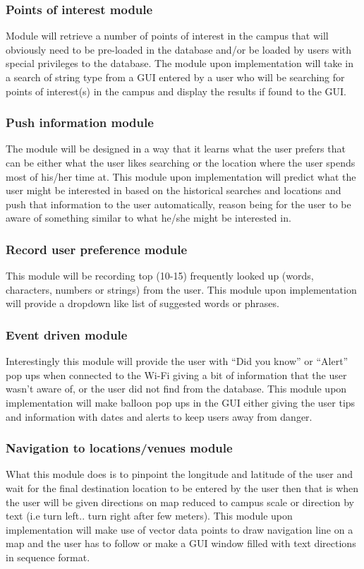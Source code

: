 \documentclass[11pt]{article}
\begin{document}
			\subsubsection{Points of interest module}
			Module will retrieve a number of points of interest in the campus that will obviously need to be pre-loaded in the database and/or be loaded by users with special privileges to the database. The module upon implementation will take in a search of string type from a GUI entered by a user who will be searching for points of interest(s) in the campus and display the results if found to the GUI.
			\subsubsection{Push information module}
			The module will be designed in a way that it learns what the user prefers that can be either what the user likes searching or the location where the user spends most of his/her time at. This module upon implementation will predict what the user might be interested in based on the historical searches and locations and push that information to the user automatically, reason being for the user to be aware of something similar to what he/she might be interested in.
			\subsubsection{Record user preference module}
			This module will be recording top (10-15) frequently looked up (words, characters, numbers or strings) from the user. This module upon implementation will provide a dropdown like list of suggested words or phrases.
			\subsubsection{Event driven module}
			Interestingly this module will provide the user with “Did you know” or “Alert” pop ups when connected to the Wi-Fi giving a bit of information that the user wasn’t aware of, or the user did not find from the database. This module upon implementation will make balloon pop ups in the GUI either giving the user tips and information with dates and alerts to keep users away from danger.
			\subsubsection{Navigation to locations/venues module}
			What this module does is to pinpoint the longitude and latitude of the user and wait for the final destination location to be entered by the user then that is when the user will be given directions on map reduced to campus scale or direction by text (i.e turn left.. turn right after few meters). This module upon implementation will make use of vector data points to draw navigation line on a map and the user has to follow or make a GUI window filled with text directions in sequence format.
\end{document}
